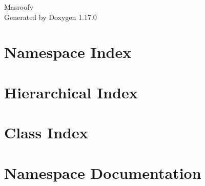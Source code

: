\documentclass[twoside]{book}
\newcommand{\+}{\discretionary{\mbox{\scriptsize$\hookleftarrow$}}{}{}}
\newcommand{\clearemptydoublepage}{%
    \newpage{\pagestyle{empty}\cleardoublepage}%
  }
\begin{document}
  \raggedbottom
  \begin{titlepage}
  \vspace*{7cm}
  \begin{center}%
  {\Large Masroofy}\\
  \vspace*{1cm}
  {\large Generated by Doxygen 1.17.0}\\
  \end{center}
  \end{titlepage}
  \clearemptydoublepage
  \tableofcontents
  \clearemptydoublepage
\chapter{Namespace Index}

\chapter{Hierarchical Index}

\chapter{Class Index}

\chapter{Namespace Documentation}










\end{document}

